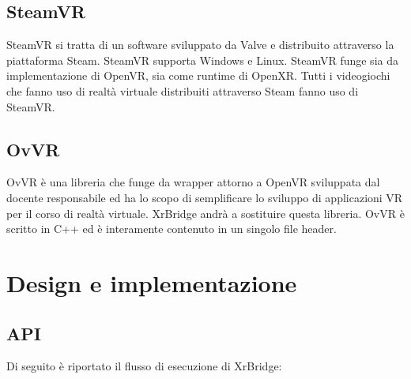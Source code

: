 \documentclass[twoside]{supsistudent}
\begin{document}
\section{SteamVR}

SteamVR si tratta di un software sviluppato da Valve e distribuito attraverso la piattaforma Steam. SteamVR supporta Windows e Linux. SteamVR funge sia da implementazione di OpenVR, sia come runtime di OpenXR. Tutti i videogiochi che fanno uso di realtà virtuale distribuiti attraverso Steam fanno uso di SteamVR.

\section{OvVR}

OvVR è una libreria che funge da wrapper attorno a OpenVR sviluppata dal docente responsabile ed ha lo scopo di semplificare lo sviluppo di applicazioni VR per il corso di realtà virtuale. XrBridge andrà a sostituire questa libreria. OvVR è scritto in C++ ed è interamente contenuto in un singolo file header.

\chapter{Design e implementazione}

\section{API}

Di seguito è riportato il flusso di esecuzione di XrBridge:
\end{document}
